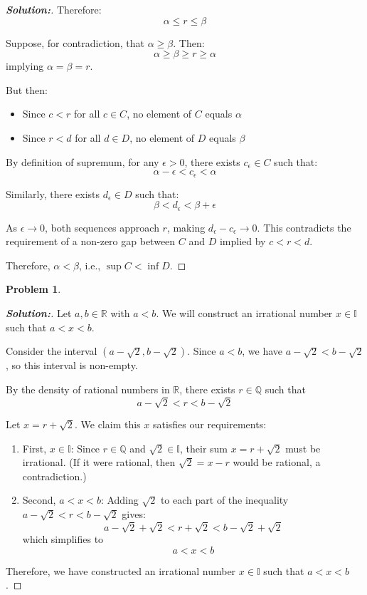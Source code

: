 \documentclass[12pt]{article}
\theoremstyle{definition}\newtheorem{problem}{Problem}
\newenvironment{solution}{\begin{proof}[\bfseries\textup{Solution:}]}{\end{proof}}
\begin{document}
\begin{solution}
    Therefore:
    \[ \alpha \leq r \leq \beta \]
    
    Suppose, for contradiction, that $\alpha \geq \beta$. Then:
    \[ \alpha \geq \beta \geq r \geq \alpha \]
    implying $\alpha = \beta = r$.
    
    But then:
    \begin{itemize}
        \item Since $c < r$ for all $c \in C$, no element of $C$ equals $\alpha$
        \item Since $r < d$ for all $d \in D$, no element of $D$ equals $\beta$
    \end{itemize}
    
    By definition of supremum, for any $\epsilon > 0$, there exists $c_\epsilon \in C$ such that:
    \[ \alpha - \epsilon < c_\epsilon < \alpha \]
    
    Similarly, there exists $d_\epsilon \in D$ such that:
    \[ \beta < d_\epsilon < \beta + \epsilon \]
    
    As $\epsilon \to 0$, both sequences approach $r$, making $d_\epsilon - c_\epsilon \to 0$.
    This contradicts the requirement of a non-zero gap between $C$ and $D$ implied by $c < r < d$.
    
    Therefore, $\alpha < \beta$, i.e., $\sup C < \inf D$.
    \end{solution}

\newpage
\begin{problem}
\end{problem}

\begin{solution}
    Let $a,b \in \mathbb{R}$ with $a < b$. We will construct an irrational number $x \in \mathbb{I}$ such that $a < x < b$.
    
    Consider the interval $(a-\sqrt{2}, b-\sqrt{2})$. Since $a < b$, we have $a-\sqrt{2} < b-\sqrt{2}$, so this interval is non-empty. 
    
    By the density of rational numbers in $\mathbb{R}$, there exists $r \in \mathbb{Q}$ such that
    \[
    a-\sqrt{2} < r < b-\sqrt{2}
    \]
    
    Let $x = r + \sqrt{2}$. We claim this $x$ satisfies our requirements:
    
    \begin{enumerate}
        \item First, $x \in \mathbb{I}$: Since $r \in \mathbb{Q}$ and $\sqrt{2} \in \mathbb{I}$, their sum $x = r + \sqrt{2}$ must be irrational. (If it were rational, then $\sqrt{2} = x - r$ would be rational, a contradiction.)
        
        \item Second, $a < x < b$: Adding $\sqrt{2}$ to each part of the inequality $a-\sqrt{2} < r < b-\sqrt{2}$ gives:
        \[
        a-\sqrt{2}+\sqrt{2} < r+\sqrt{2} < b-\sqrt{2}+\sqrt{2}
        \]
        which simplifies to
        \[
        a < x < b
        \]
    \end{enumerate}
    
    Therefore, we have constructed an irrational number $x \in \mathbb{I}$ such that $a < x < b$.
\end{solution}
\end{document}
